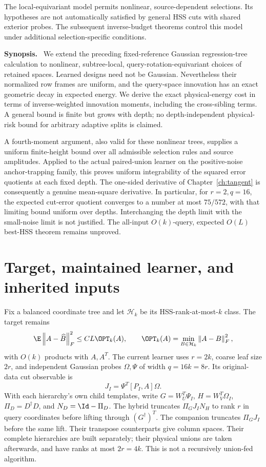 \documentclass[11pt,oneside,openany,a4paper]{book}
\numberwithin{equation}{chapter}
\theoremstyle{definition}
\theoremstyle{remark}
\newenvironment{chaptersynopsis}{\begingroup\small\textbf{Synopsis.}\ }{\par\endgroup\medskip}
\newcommand{\F}[1]{\left\lVert#1\right\rVert_F}
\begin{document}
\begin{scopebox}
The local-equivariant model permits nonlinear, source-dependent selections. Its hypotheses are not automatically satisfied by general HSS cuts with shared exterior probes. The subsequent inverse-budget theorems control this model under additional selection-specific conditions.
\end{scopebox}
\thispagestyle{plain}
\begin{chaptersynopsis}
We extend the preceding fixed-reference Gaussian regression-tree calculation to nonlinear, subtree-local, query-rotation-equivariant choices of retained spaces. Learned designs need not be Gaussian. Nevertheless their normalized row frames are uniform, and the query-space innovation has an exact geometric decay in expected energy. We derive the exact physical-energy cost in terms of inverse-weighted innovation moments, including the cross-sibling terms. A general bound is finite but grows with depth; no depth-independent physical-risk bound for arbitrary adaptive splits is claimed.

A fourth-moment argument, also valid for these nonlinear trees, supplies a uniform finite-height bound over all admissible selection rules and source amplitudes. Applied to the actual paired-union learner on the positive-noise anchor-trapping family, this proves uniform integrability of the squared error quotients at each fixed depth. The one-sided derivative of Chapter~\ref{ch:tangent} is consequently a genuine mean-square derivative. In particular, for $r=2,q=16$, the expected cut-error quotient converges to a number at most $75/572$, with that limiting bound uniform over depths. Interchanging the depth limit with the small-noise limit is not justified. The all-input $O(k)$-query, expected $O(L)$ best-HSS theorem remains unproved.
\end{chaptersynopsis}


\section{Target, maintained learner, and inherited inputs}
Fix a balanced coordinate tree and let $\mathcal H_k$ be its HSS-rank-at-most-$k$ class. The target remains
\[
 \E\F{A-\widehat B}^2\le CL\OPT_k(A),\qquad
 \OPT_k(A)=\min_{B\in\mathcal H_k}\F{A-B}^2,
\]
with $O(k)$ products with $A,A^T$. The current learner uses $r=2k$, coarse leaf size $2r$, and independent Gaussian probes $\Omega,\Psi$ of width $q=16k=8r$. Its original-data cut observable is
\[
 J_I=\Psi^T[P_I,A]\Omega.
\]
With each hierarchy's own child templates, write $G=W_U^T\Psi_I$, $H=W_V^T\Omega_I$, $\Pi_D=D^\dagger D$, and $N_D=\Id-\Pi_D$. The hybrid truncates $\Pi_GJ_IN_H$ to rank $r$ in query coordinates before lifting through $(G^\dagger)^T$. The companion truncates $\Pi_GJ_I$ before the same lift. Their transpose counterparts give column spaces. Their complete hierarchies are built separately; their physical unions are taken afterwards, and have ranks at most $2r=4k$. This is not a recursively union-fed algorithm.
\end{document}
